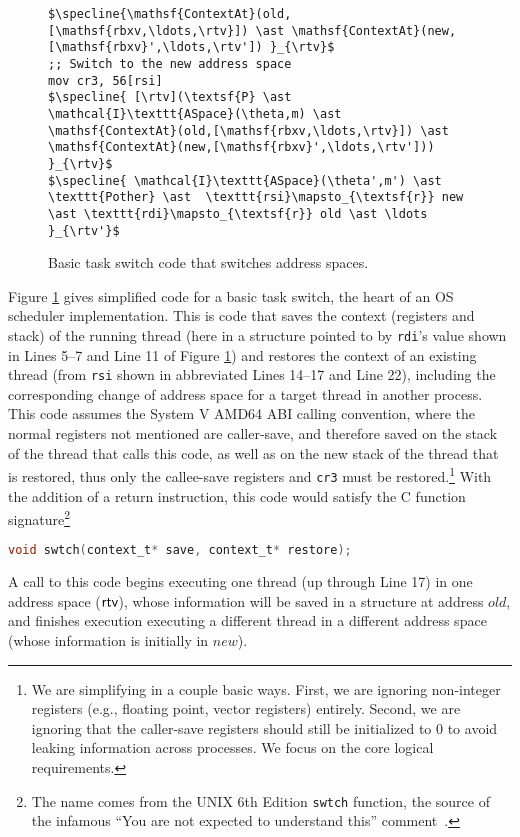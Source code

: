 \begin{figure}
\begin{lstlisting}[mathescape]
$\specline{\mathsf{ContextAt}(old,[\mathsf{rbxv,\ldots,\rtv}]) \ast \mathsf{ContextAt}(new,[\mathsf{rbxv}',\ldots,\rtv']) }_{\rtv}$
;; Switch to the new address space
mov cr3, 56[rsi]
$\specline{ [\rtv](\textsf{P} \ast \mathcal{I}\texttt{ASpace}(\theta,m) \ast \mathsf{ContextAt}(old,[\mathsf{rbxv,\ldots,\rtv}]) \ast \mathsf{ContextAt}(new,[\mathsf{rbxv}',\ldots,\rtv']))  }_{\rtv}$
$\specline{ \mathcal{I}\texttt{ASpace}(\theta',m') \ast \texttt{Pother} \ast  \texttt{rsi}\mapsto_{\textsf{r}} new \ast \texttt{rdi}\mapsto_{\textsf{r}} old \ast \ldots }_{\rtv'}$
\end{lstlisting}
\vspace{-1em}
\caption{Basic task switch code that switches address spaces.}
\label{fig:swtch}
\end{figure}

Figure \ref{fig:swtch} gives simplified code for a basic task switch, the heart of an OS scheduler implementation. This is code that saves the context (registers and stack)
of the running thread (here in a structure pointed to by \lstinline|rdi|'s value shown in Lines 5--7 and Line 11 of Figure \ref{fig:swtch}) and restores the context of 
an existing thread (from \lstinline|rsi| shown in abbreviated Lines 14--17 and Line 22), including the corresponding change of address space for a target thread in another process.
This code assumes the System V AMD64 ABI calling convention, where the normal registers not mentioned are caller-save, and therefore saved on the stack of the thread
that calls this code, as well as on the new stack of the thread that is restored, thus only the callee-save registers and \texttt{cr3} must be 
restored.\footnote{We are simplifying in a couple basic ways. First, we are ignoring non-integer registers (e.g., floating point, vector registers) entirely. Second, we are ignoring that the caller-save registers should still be initialized to 0 to avoid leaking information across processes. We focus on the core logical requirements.}
With the addition of a return instruction, this code would satisfy the C function signature\footnote{The name comes from the UNIX 6th Edition \lstinline|swtch| function, the source of the infamous ``You are not expected to understand this'' comment~\cite{lions1996lions}.}
\begin{lstlisting}[language=C]
void swtch(context_t* save, context_t* restore);
\end{lstlisting}
A call to this code begins executing one thread (up through Line 17) in one address space ($\textsf{rtv}$), whose information will be saved in a structure at address $old$,
and finishes execution executing a different thread in a different address space (whose information is initially in $new$).

